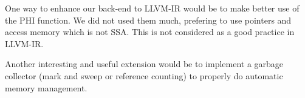 One way to enhance our back-end to LLVM-IR would be to make better use of the PHI function. We did not used them much, prefering to use pointers and access memory which is not SSA. This is not considered as a good practice in LLVM-IR.

Another interesting and useful extension would be to implement a garbage collector (mark and sweep or reference counting) to properly do automatic memory management.
